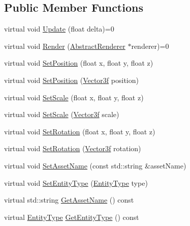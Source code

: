 \subsection*{Public Member Functions}
\begin{DoxyCompactItemize}
\item 
virtual void \mbox{\hyperlink{classse_1_1_entity_a1542c96865f6646c7b0cb0d9be7f88ad}{Update}} (float delta)=0
\item 
virtual void \mbox{\hyperlink{classse_1_1_entity_a50066f09c64b3b9705b71366cc565527}{Render}} (\mbox{\hyperlink{classse_1_1_abstract_renderer}{Abstract\+Renderer}} $\ast$renderer)=0
\item 
virtual void \mbox{\hyperlink{classse_1_1_entity_a09e198e70620f231106d9f375f7598f3}{Set\+Position}} (float x, float y, float z)
\item 
virtual void \mbox{\hyperlink{classse_1_1_entity_ae0d37a4774afab2b7abf4118efc57499}{Set\+Position}} (\mbox{\hyperlink{namespacese_a12e07512d95e2fdebdaf74a5ea2cf5f6}{Vector3f}} position)
\item 
virtual void \mbox{\hyperlink{classse_1_1_entity_a812b63adcbf5f1a3e429a31c6e0ff940}{Set\+Scale}} (float x, float y, float z)
\item 
virtual void \mbox{\hyperlink{classse_1_1_entity_a70df7cdf2d72ff4d767033c2994b673f}{Set\+Scale}} (\mbox{\hyperlink{namespacese_a12e07512d95e2fdebdaf74a5ea2cf5f6}{Vector3f}} scale)
\item 
virtual void \mbox{\hyperlink{classse_1_1_entity_a41f820b99b2b6d76c97472dcddca7fa2}{Set\+Rotation}} (float x, float y, float z)
\item 
virtual void \mbox{\hyperlink{classse_1_1_entity_a950373cfaaad7ad4bba06f3ab8534efd}{Set\+Rotation}} (\mbox{\hyperlink{namespacese_a12e07512d95e2fdebdaf74a5ea2cf5f6}{Vector3f}} rotation)
\item 
virtual void \mbox{\hyperlink{classse_1_1_entity_a4fcf5639a2e6e74e0b12893e70a46a83}{Set\+Asset\+Name}} (const std\+::string \&asset\+Name)
\item 
virtual void \mbox{\hyperlink{classse_1_1_entity_a0550faa593742dbd41284971c24c410e}{Set\+Entity\+Type}} (\mbox{\hyperlink{namespacese_ae73a909a94998bc95235eb9b16e405f1}{Entity\+Type}} type)
\item 
virtual std\+::string \mbox{\hyperlink{classse_1_1_entity_af1d512cba984ffe167decd7ecf7a88f4}{Get\+Asset\+Name}} () const
\item 
virtual \mbox{\hyperlink{namespacese_ae73a909a94998bc95235eb9b16e405f1}{Entity\+Type}} \mbox{\hyperlink{classse_1_1_entity_aec26e9fd7f7c4c6d89e1e459a5eb028a}{Get\+Entity\+Type}} () const

\end{DoxyCompactItemize}
